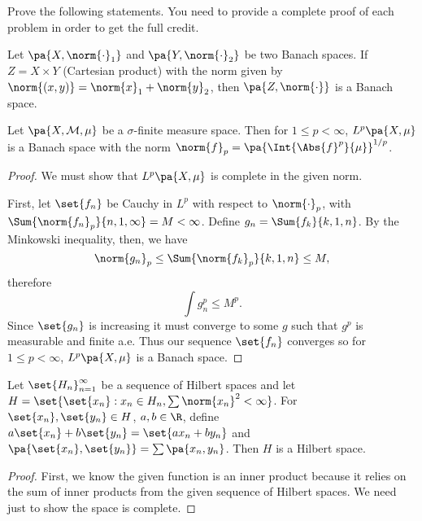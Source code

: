 \documentclass[12pt,letterpaper,twoside]{hmcpset}
\begin{document}
\noindent Prove the following statements.  You need to provide a complete proof of each problem in order to get the full credit.

\begin{problem}[1][10]
 Let $\pa{X,\norm{\cdot}_1}$ and $\pa{Y,\norm{\cdot}_2}$ be two Banach spaces. If $Z = X \times Y$ (Cartesian product) with the norm given by $\norm{(x,y)} = \norm{x}_1 + \norm{y}_2$, then $\pa{Z,\norm{\cdot}}$ is a Banach space.
\end{problem}

\begin{problem}[2][10]
 Let $\pa{X, \mathcal{M}, \mu}$ be a $\sigma$-finite measure space.  Then for $1 \leq p < \infty$, $L^p\pa{X,\mu}$ is a Banach space with the norm $\norm{f}_p = \pa{\Int{\Abs{f}^p}{\mu}}^{1/p}$.
\end{problem}

\begin{solution}
 \begin{proof}
  We must show that $L^p\pa{X,\mu}$ is complete in the given norm.
  
  First, let $\set{f_n}$ be Cauchy in $L^p$ with respect to $\norm{\cdot}_p$, 
with $\Sum{\norm{f_n}_p}{n,1,\infty} = M < \infty$. Define $g_n = 
\Sum{f_k}{k,1,n}$. By the Minkowski inequality, then, we have 
\[\norm{g_n}_p \leq \Sum{\norm{f_k}_p}{k,1,n} \leq M,\] therefore 
\[\int g_n^p \leq M^p.\] Since $\set{g_n}$ is increasing it must converge to 
some $g$ such that $g^p$ is measurable and finite a.e. Thus our sequence 
$\set{f_n}$ converges so for $1 \leq p < \infty$, $L^p\pa{X,\mu}$ is a Banach 
space.
 \end{proof}
\end{solution}


\begin{problem}[3][20]
 Let $\set{H_n}_{n=1}^\infty$ be a sequence of Hilbert spaces and let $H = \set{\set{x_n} : x_n \in H_n, \sum\norm{x_n}^2 < \infty}$. For $\set{x_n},\set{y_n} \in H$, $a,b \in \R$, define $a\set{x_n} + b\set{y_n} = \set{ax_n + by_n}$ and $\pa{\set{x_n},\set{y_n}} = \sum\pa{x_n,y_n}$. Then $H$ is a Hilbert space.
\end{problem}

\begin{solution}
 \begin{proof}
  First, we know the given function is an inner product because it relies on 
the sum of inner products from the given sequence of Hilbert spaces.  We need 
just to show the space is complete.
  
 \end{proof}

\end{solution}
\end{document}
